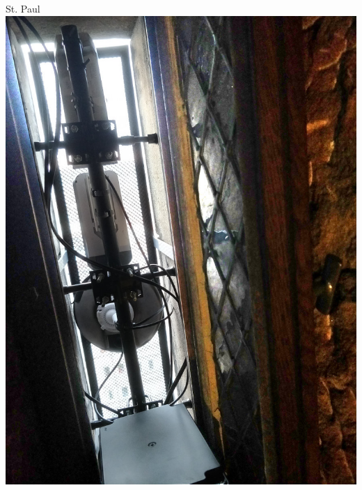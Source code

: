 \begin{frame}{St. Paul}
{        \hfill
        \includegraphics[height=0.86\textheight]{img/stpaul-fenster}
        \hfill
        ~
    }
\end{frame}

